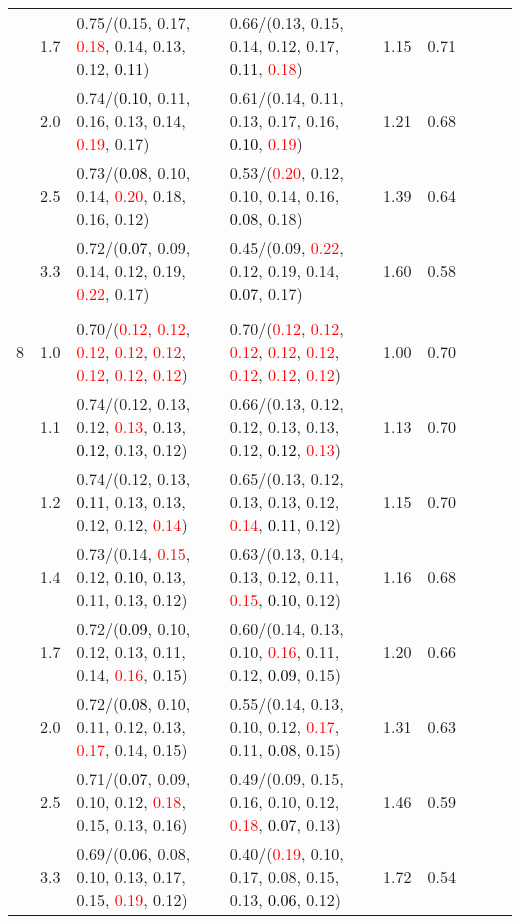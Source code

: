 \documentclass[10pt,a4paper]{report}
\begin{document}
\begin{table}[!htbp]
\begin{center}
{\begin{tabular}{ccllccccc}
			&1.7&0.75/(0.15, 0.17, \textcolor{red}{0.18}, 0.14, 0.13, 0.12, \textcolor{black}{0.11})&0.66/(0.13, 0.15, 0.14, 0.12, 0.17, \textcolor{black}{0.11}, \textcolor{red}{0.18})&1.15&0.71\\
			&2.0&0.74/(\textcolor{black}{0.10}, 0.11, 0.16, 0.13, 0.14, \textcolor{red}{0.19}, 0.17)&0.61/(0.14, 0.11, 0.13, 0.17, 0.16, \textcolor{black}{0.10}, \textcolor{red}{0.19})&1.21&0.68\\
			&2.5&0.73/(\textcolor{black}{0.08}, 0.10, 0.14, \textcolor{red}{0.20}, 0.18, 0.16, 0.12)&0.53/(\textcolor{red}{0.20}, 0.12, 0.10, 0.14, 0.16, \textcolor{black}{0.08}, 0.18)&1.39&0.64\\
			&3.3&0.72/(\textcolor{black}{0.07}, 0.09, 0.14, 0.12, 0.19, \textcolor{red}{0.22}, 0.17)&0.45/(0.09, \textcolor{red}{0.22}, 0.12, 0.19, 0.14, \textcolor{black}{0.07}, 0.17)&1.60&0.58\\
			&&&&\\
			8			&1.0&0.70/(\textcolor{red}{0.12}, \textcolor{red}{0.12}, \textcolor{red}{0.12}, \textcolor{red}{0.12}, \textcolor{red}{0.12}, \textcolor{red}{0.12}, \textcolor{red}{0.12}, \textcolor{red}{0.12})&0.70/(\textcolor{red}{0.12}, \textcolor{red}{0.12}, \textcolor{red}{0.12}, \textcolor{red}{0.12}, \textcolor{red}{0.12}, \textcolor{red}{0.12}, \textcolor{red}{0.12}, \textcolor{red}{0.12})&1.00&0.70\\
			&1.1&0.74/(0.12, 0.13, 0.12, \textcolor{red}{0.13}, 0.13, \textcolor{black}{0.12}, 0.13, 0.12)&0.66/(0.13, 0.12, 0.12, 0.13, 0.13, 0.12, \textcolor{black}{0.12}, \textcolor{red}{0.13})&1.13&0.70\\
			&1.2&0.74/(0.12, 0.13, \textcolor{black}{0.11}, 0.13, 0.13, 0.12, 0.12, \textcolor{red}{0.14})&0.65/(0.13, 0.12, 0.13, 0.13, 0.12, \textcolor{red}{0.14}, \textcolor{black}{0.11}, 0.12)&1.15&0.70\\
			&1.4&0.73/(0.14, \textcolor{red}{0.15}, 0.12, \textcolor{black}{0.10}, 0.13, 0.11, 0.13, 0.12)&0.63/(0.13, 0.14, 0.13, 0.12, 0.11, \textcolor{red}{0.15}, \textcolor{black}{0.10}, 0.12)&1.16&0.68\\
			&1.7&0.72/(\textcolor{black}{0.09}, 0.10, 0.12, 0.13, 0.11, 0.14, \textcolor{red}{0.16}, 0.15)&0.60/(0.14, 0.13, 0.10, \textcolor{red}{0.16}, 0.11, 0.12, \textcolor{black}{0.09}, 0.15)&1.20&0.66\\
			&2.0&0.72/(\textcolor{black}{0.08}, 0.10, 0.11, 0.12, 0.13, \textcolor{red}{0.17}, 0.14, 0.15)&0.55/(0.14, 0.13, 0.10, 0.12, \textcolor{red}{0.17}, 0.11, \textcolor{black}{0.08}, 0.15)&1.31&0.63\\
			&2.5&0.71/(\textcolor{black}{0.07}, 0.09, 0.10, 0.12, \textcolor{red}{0.18}, 0.15, 0.13, 0.16)&0.49/(0.09, 0.15, 0.16, 0.10, 0.12, \textcolor{red}{0.18}, \textcolor{black}{0.07}, 0.13)&1.46&0.59\\
			&3.3&0.69/(\textcolor{black}{0.06}, 0.08, 0.10, 0.13, 0.17, 0.15, \textcolor{red}{0.19}, 0.12)&0.40/(\textcolor{red}{0.19}, 0.10, 0.17, 0.08, 0.15, 0.13, \textcolor{black}{0.06}, 0.12)&1.72&0.54\\
			\bottomrule
		\end{tabular}}
	\end{center}
\end{table}
\end{document}
